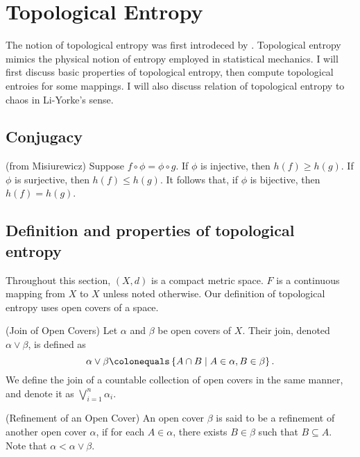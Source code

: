 \documentclass[12pt,twoside,draft]{book}
\begin{document}
\chapter{Topological Entropy}
The notion of topological entropy was first introdeced by \citet{akm}.
Topological entropy mimics the physical notion of entropy employed in statistical mechanics.
I will first discuss basic properties of topological entropy, then compute topological entroies for some mappings.
I will also discuss relation of topological entropy to chaos in Li-Yorke's sense.

\section{Conjugacy}
(from Misiurewicz)
Suppose $f\circ \phi = \phi \circ g$.
If $\phi$ is injective, then $h(f) \geq h(g)$.
If $\phi$ is surjective, then $h(f) \leq h(g)$.
It follows that, if $\phi$ is bijective, then $h(f) = h(g)$.

\section{Definition and properties of topological entropy}
Throughout this section, $(X,d)$ is a compact metric space.
$F$ is a continuous mapping from $X$ to $X$ unless noted otherwise.
Our definition of topological entropy uses open covers of a space. 

\begin{definition}
  (Join of Open Covers)
  Let $\alpha$ and $\beta$ be open covers of $X$.
  Their join, denoted $\alpha \vee \beta$, is defined as
  \begin{equation*}
    \alpha \vee \beta \ceq \setst{A \cap B}{A \in \alpha, B \in \beta}.
  \end{equation*}
  We define the join of a countable collection of open covers in the same manner, and denote it as $\bigvee\limits_{i = 1}^{n} \alpha_i$.
\end{definition}

\begin{definition}
  (Refinement of an Open Cover)
  An open cover $\beta$ is said to be a refinement of another open cover $\alpha$, if for each $A \in \alpha$, there exists $B \in \beta$ such that $B \subseteq A$.
  Note that $\alpha < \alpha \vee \beta$.
\end{definition}
\end{document}
